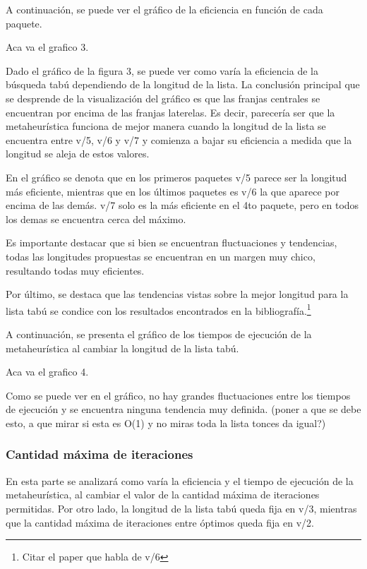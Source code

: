 \documentclass[a4paper,10pt]{article}
\begin{document}
A continuaci\'on, se puede ver el gr\'afico de la eficiencia en funci\'on de cada paquete. 

Aca va el grafico 3.

Dado el gr\'afico de la figura 3, se puede ver como var\'ia la eficiencia de la b\'usqueda tab\'u dependiendo de la longitud de la lista. La conclusi\'on principal que se desprende de la visualizaci\'on del gr\'afico es que las franjas centrales se encuentran por encima de las franjas laterelas. Es decir, parecer\'ia ser que la metaheur\'istica funciona de mejor manera cuando la longitud de la lista se encuentra entre v/5, v/6 y v/7 y comienza a bajar su eficiencia a medida que la longitud se aleja de estos valores.

En el gr\'afico se denota que en los primeros paquetes v/5 parece ser la longitud m\'as eficiente, mientras que en los \'ultimos paquetes es v/6 la que aparece por encima de las dem\'as. v/7 solo es la m\'as eficiente en el 4to paquete, pero en todos los demas se encuentra cerca del m\'aximo.

Es importante destacar que si bien se encuentran fluctuaciones y tendencias, todas las longitudes propuestas se encuentran en un margen muy chico, resultando todas muy eficientes.

Por \'ultimo, se destaca que las tendencias vistas sobre la mejor longitud para la lista tab\'u se condice con los resultados encontrados en la bibliograf\'ia.\footnote{Citar el paper que habla de v/6}

\bigskip

A continuaci\'on, se presenta el gr\'afico de los tiempos de ejecuci\'on de la metaheur\'istica al cambiar la longitud de la lista tab\'u.

Aca va el grafico 4.



Como se puede ver en el gr\'afico, no hay grandes fluctuaciones entre los tiempos de ejecuci\'on y se encuentra ninguna tendencia muy definida. (poner a que se debe esto, a que mirar si esta es O(1) y no miras toda la lista tonces da igual?)

\subsubsection*{Cantidad m\'axima de iteraciones}

En esta parte se analizar\'a como var\'ia la eficiencia y el tiempo de ejecuci\'on de la metaheur\'istica, al cambiar el valor de la cantidad m\'axima de iteraciones permitidas. Por otro lado, la longitud de la lista tab\'u queda fija en v/3, mientras que la cantidad m\'axima de iteraciones entre \'optimos queda fija en v/2.
\end{document}
